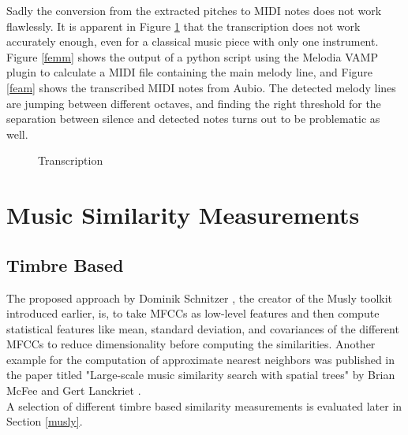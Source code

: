 \noindent Sadly the conversion from the extracted pitches to MIDI notes does not work flawlessly. It is apparent in Figure \ref{fig:transc} that the transcription does not work accurately enough, even for a classical music piece with only one instrument. Figure \ref{femm} shows the output of a python script using the Melodia VAMP plugin to calculate a MIDI file containing the main melody line, and Figure \ref{feam} shows the transcribed MIDI notes from Aubio. The detected melody lines are jumping between different octaves, and finding the right threshold for the separation between silence and detected notes turns out to be problematic as well.

\begin{figure}[htbp]
	\centering
	\caption{Transcription}
	\label{fig:transc}
\end{figure}
\FloatBarrier 

\section{Music Similarity Measurements}

\subsection{Timbre Based}

The proposed approach by Dominik Schnitzer \cite{schnitzer1}, the creator of the Musly toolkit introduced earlier, is, to take MFCCs as low-level features and then compute statistical features like mean, standard deviation, and covariances of the different MFCCs to reduce dimensionality before computing the similarities. Another example for the computation of approximate nearest neighbors was published in the paper titled "Large-scale music similarity search with spatial trees" by Brian McFee and Gert Lanckriet \cite{msd4}.\\ 
A selection of different timbre based similarity measurements is evaluated later in Section \ref{musly}.

